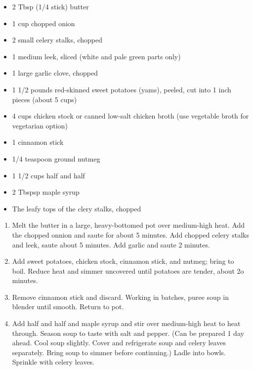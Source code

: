 \documentclass{article}
\begin{document}
\begin{framed}
    \begin{itemize}
        \item 2 Tbsp (1/4 stick) butter
        \item 1 cup chopped onion
        \item 2 small celery stalks, chopped
        \item 1 medium leek, sliced (white and pale green parts only)
        \item 1 large garlic clove, chopped
        \item 1 1/2 pounds red-skinned sweet potatoes (yams), peeled, cut into 1 inch pieces (about 5 cups)
        \item 4 cups chicken stock or canned low-salt chicken broth (use vegetable broth for vegetarian option)
        \item 1 cinnamon stick
        \item 1/4 teaspoon ground nutmeg
        \item 1 1/2 cups half and half
        \item 2 Tbspsp maple syrup
        \item The leafy tops of the clery stalks, chopped
    \end{itemize}
\end{framed}

\begin{enumerate}
    \item 
        Melt the butter in a large, heavy-bottomed pot over medium-high heat. Add the chopped onnion and saute for about 5 minutes. Add chopped celery stalks and leek, saute about 5 minutes. Add garlic and saute 2 minutes.
    \item
        Add sweet potatoes, chicken stock, cinnamon stick, and nutmeg; bring to boil. Reduce heat and simmer uncovered until potatoes are tender, about 2o minutes.
    \item
        Remove cinnamon stick and discard. Working in batches, puree soup in blender until smooth. Return to pot.
    \item 
        Add half and half and maple syrup and stir over medium-high heat to heat through. Season soup to taste with salt and pepper. (Can be prepared 1 day ahead. Cool soup slightly. Cover and refrigerate soup and celery leaves separately. Bring soup to simmer before continuing.) Ladle into bowls. Sprinkle with celery leaves.
\end{enumerate}
\newpage
\end{document}

